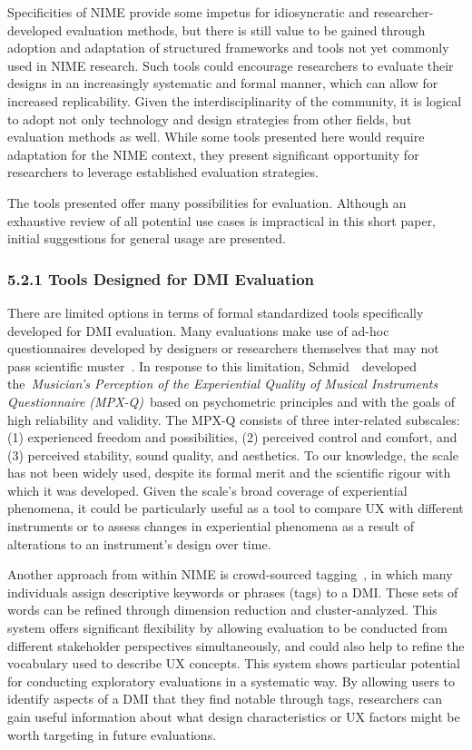 \documentclass[sigconf]{nimeart}
\begin{document}
Specificities of NIME provide some impetus for idiosyncratic and researcher-developed evaluation methods, but there is still value to be gained through adoption and adaptation of structured frameworks and tools not yet commonly used in NIME research. Such tools could encourage researchers to evaluate their designs in an increasingly systematic and formal manner, which can allow for increased replicability. Given the interdisciplinarity of the community, it is logical to adopt not only technology and design strategies from other fields, but evaluation methods as well. While some tools presented here would require adaptation for the NIME context, they present significant opportunity for researchers to leverage established evaluation strategies.~

The tools presented offer many possibilities for evaluation. Although an exhaustive review of all potential use cases is impractical in this short paper, initial suggestions for general usage are presented.

\subsubsection{5.2.1 Tools Designed for DMI Evaluation}\label{tools-designed-for-dmi-evaluation}

There are limited options in terms of formal standardized tools specifically developed for DMI evaluation. Many evaluations make use of ad-hoc questionnaires developed by designers or researchers themselves that may not pass scientific muster~\cite{c24}. In response to this limitation, Schmid~\cite{c24}~developed the~\emph{Musician's Perception of the Experiential Quality of Musical Instruments Questionnaire (MPX-Q)}~based on psychometric principles and with the goals of high reliability and validity. The MPX-Q consists of three inter-related subscales: (1) experienced freedom and possibilities, (2) perceived control and comfort, and (3) perceived stability, sound quality, and aesthetics. To our knowledge, the scale has not been widely used, despite its formal merit and the scientific rigour with which it was developed. Given the scale's broad coverage of experiential phenomena, it could be particularly useful as a tool to compare UX with different instruments or to assess changes in experiential phenomena as a result of alterations to an instrument's design over time.~

Another approach from within NIME is crowd-sourced tagging~\cite{c25}, in which many individuals assign descriptive keywords or phrases (tags) to a DMI. These sets of words can be refined through dimension reduction and cluster-analyzed. This system offers significant flexibility by allowing evaluation to be conducted from different stakeholder perspectives simultaneously, and could also help to refine the vocabulary used to describe UX concepts. This system shows particular potential for conducting exploratory evaluations in a systematic way. By allowing users to identify aspects of a DMI that they find notable through tags, researchers can gain useful information about what design characteristics or UX factors might be worth targeting in future evaluations.
\end{document}
